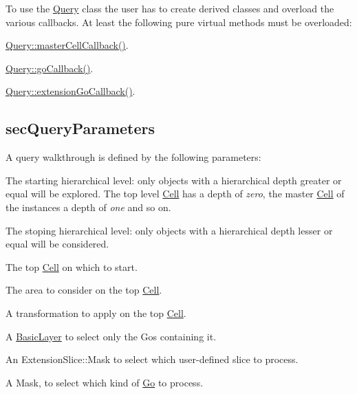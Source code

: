 To use the \mbox{\hyperlink{classHurricane_1_1Query}{Query}} class the user has to create derived classes and overload the various callbacks. At least the following pure virtual methods must be overloaded\+:
\begin{DoxyItemize}
\item \mbox{\hyperlink{classHurricane_1_1Query_abaf97e93c7fa96469adf64f7865938b4}{Query\+::master\+Cell\+Callback()}}.
\item \mbox{\hyperlink{classHurricane_1_1Query_a59007148bd0afa0405801f341e7e4139}{Query\+::go\+Callback()}}.
\item \mbox{\hyperlink{classHurricane_1_1Query_a75b87e969b64caaf24ec058c0d2dfa68}{Query\+::extension\+Go\+Callback()}}.
\end{DoxyItemize}\hypertarget{classHurricane_1_1Query_secQueryParameters}{}\subsection{sec\+Query\+Parameters}\label{classHurricane_1_1Query_secQueryParameters}
A query walkthrough is defined by the following parameters\+:
\begin{DoxyItemize}
\item The starting hierarchical level\+: only objects with a hierarchical depth greater or equal will be explored. The top level \mbox{\hyperlink{classHurricane_1_1Cell}{Cell}} has a depth of {\itshape zero}, the master \mbox{\hyperlink{classHurricane_1_1Cell}{Cell}} of the instances a depth of {\itshape one} and so on.
\item The stoping hierarchical level\+: only objects with a hierarchical depth lesser or equal will be considered.
\item The top \mbox{\hyperlink{classHurricane_1_1Cell}{Cell}} on which to start.
\item The area to consider on the top \mbox{\hyperlink{classHurricane_1_1Cell}{Cell}}.
\item A transformation to apply on the top \mbox{\hyperlink{classHurricane_1_1Cell}{Cell}}.
\item A \mbox{\hyperlink{classHurricane_1_1BasicLayer}{Basic\+Layer}} to select only the Gos containing it.
\item An Extension\+Slice\+::\+Mask to select which user-\/defined slice to process.
\item A Mask, to select which kind of \mbox{\hyperlink{classHurricane_1_1Go}{Go}} to process. 
\end{DoxyItemize}

